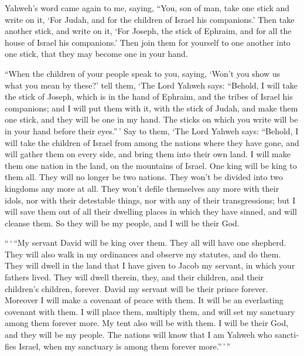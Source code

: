 \begin{paracol}{2}
\begin{otherlanguage}{english}
 Yahweh's word came again to me, saying, 
``You, son of man, take one stick and write on it, `For Judah, and for
the children of Israel his companions.' Then take another stick, and
write on it, `For Joseph, the stick of Ephraim, and for all the house of
Israel his companions.'  Then join them for yourself to
one another into one stick, that they may become one in your hand.

 ``When the children of your people speak to you, saying,
`Won't you show us what you mean by these?'  tell them,
`The Lord Yahweh says: ``Behold, I will take the stick of Joseph, which
is in the hand of Ephraim, and the tribes of Israel his companions; and
I will put them with it, with the stick of Judah, and make them one
stick, and they will be one in my hand.  The sticks on
which you write will be in your hand before their eyes.''\,'
 Say to them, `The Lord Yahweh says: ``Behold, I will
take the children of Israel from among the nations where they have gone,
and will gather them on every side, and bring them into their own land.
 I will make them one nation in the land, on the
mountains of Israel. One king will be king to them all. They will no
longer be two nations. They won't be divided into two kingdoms any more
at all.  They won't defile themselves any more with their
idols, nor with their detestable things, nor with any of their
transgressions; but I will save them out of all their dwelling places in
which they have sinned, and will cleanse them. So they will be my
people, and I will be their God.

 ``\,`\,``My servant David will be king over them. They
all will have one shepherd. They will also walk in my ordinances and
observe my statutes, and do them.  They will dwell in the
land that I have given to Jacob my servant, in which your fathers lived.
They will dwell therein, they, and their children, and their children's
children, forever. David my servant will be their prince forever.
 Moreover I will make a covenant of peace with them. It
will be an everlasting covenant with them. I will place them, multiply
them, and will set my sanctuary among them forever more. 
My tent also will be with them. I will be their God, and they will be my
people.  The nations will know that I am Yahweh who
sanctifies Israel, when my sanctuary is among them forever
more.''\,'\,''


\end{otherlanguage}
\end{paracol}
